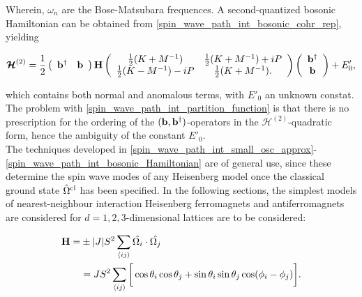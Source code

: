 \documentclass{homework}
\begin{document}
Wherein, $\omega_n$ are the Bose-Matsubara frequences. A second-quantized bosonic Hamiltonian can be obtained from \cref{spin_wave_path_int_bosonic_cohr_rep}, yielding 

\begin{equation}
    \bm{\mathcal{H}}^{(2)} = \frac{1}{2} \left(\begin{array}{cc}
        {\bf b}^\dagger & {\bf b} 
    \end{array}\right) {\bf H} \left(\begin{array}{cc}
         \frac{1}{2} (K+M^{-1}) & \frac{1}{2} (K+M^{-1}) + iP  \\
         \frac{1}{2} (K-M^{-1}) -iP & \frac{1}{2} (K+M^{-1}).
    \end{array}\right) \left(\begin{array}{c}
        {\bf b}^\dagger \\
        {\bf b} 
    \end{array}\right) + E'_0,
    \label{spin_wave_path_int_bosonic_Hamiltonian}
\end{equation}

which contains both normal and anomalous terms, with $E'_0$ an unknown constat. The problem with \cref{spin_wave_path_int_partition_function} is that there is no prescription for the ordering of the $({\bf b}, {\bf b}^\dagger)$-operators in the $\bm{\mathcal{H}}^{(2)}$-quadratic form, hence the ambiguity of the constant $E'_0$. \\

The techniques developed in \cref{spin_wave_path_int_small_osc_approx}-\cref{spin_wave_path_int_bosonic_Hamiltonian} are of general use, since these determine the spin wave modes of any Heisenberg model once the classical ground state $\hat{\Omega}^{\textnormal{cl}}$ has been specified. In the following sections, the simplest models of nearest-neighbour interaction Heisenberg ferromagnets and antiferromagnets are considered for $d = 1,2,3$-dimensional lattices are to be considered: 

\begin{equation}
    \begin{split}
        {\bf H} =& \pm |J| S^2 \sum_{\langle ij \rangle} \hat{\Omega_i} \cdot \hat{\Omega_j} \\
        &= J S^2 \sum_{\langle ij \rangle} \bigg[ \cos \theta_i \cos \theta_j + \sin \theta_i \sin \theta_j \cos(\phi_i - \phi_j) \bigg].
    \end{split}
    \label{spin_wave_path_integral_Heisenberg_Ham}
\end{equation}
\end{document}
